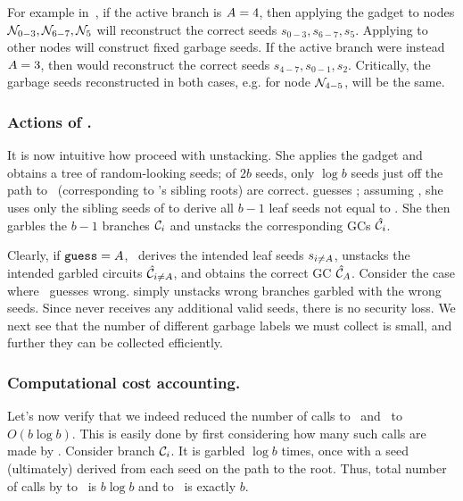 For example in~, if the active branch is $A=4$,
then applying the gadget to nodes $\mathtt{\cal N}_{0-3}, \mathtt{\cal N}_{6-7},
\mathtt{\cal N}_{5}$ will reconstruct the correct seeds $s_{0-3}, s_{6-7}, s_{5}$.  Applying \gadget to other nodes
will construct fixed garbage seeds.
If the active branch were instead $A=3$, then \gadget
would reconstruct the correct seeds $s_{4-7}, s_{0-1}, s_{2}$.
Critically, the
garbage seeds reconstructed
in both cases, e.g. for node $\mathtt{\cal N}_{4-5}$, will be the same.


\subsubsection{Actions of \E.}

It is now intuitive how \E proceed with unstacking. 
She applies
the gadget \gadget and obtains a tree of random-looking seeds; of $2b$
seeds, only $\log b$ seeds just off the path to \aid\ (corresponding
to \aid's sibling roots) are correct.  \E guesses \guess; assuming
\guess, she uses only the sibling seeds of \guess to derive all
$b-1$ leaf seeds not equal to \guess.  She then garbles the $b-1$
branches $\mathcal C_i$ and unstacks the corresponding GCs $\hat{\mathcal C}_i$.

Clearly, if $\mathtt{guess}=A$, \E\ derives the intended leaf seeds
$s_{i\neq A}$, unstacks the intended garbled circuits
$\hat{\mathcal C}_{i\neq A}$, and obtains the correct GC $\hat{\mathcal C}_{A}$.
%
Consider the case where \E\ guesses wrong. %
\E simply unstacks wrong branches garbled with the wrong seeds.
Since \E never receives any additional valid seeds,
there is no security loss.  We next see that the number of different
garbage labels we must collect is small, and further they can be
collected efficiently.







\subsubsection{Computational cost accounting.} Let's now verify that we indeed reduced the number of calls to \Gb\ and \Ev\ to $O(b \log b)$.  This is easily done by first considering how many such calls are made by \E.  
Consider branch $\mathcal C_i$.  It is garbled $\log b$ times, once with a seed (ultimately) derived from each seed on the path to the root.  Thus, total number of calls by \E to \Gb\ is $b \log b$ and to \Ev\ is exactly $b$.  




